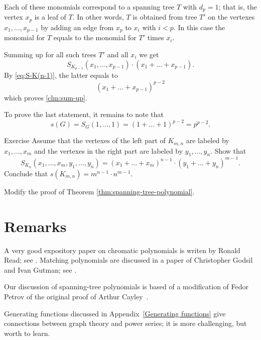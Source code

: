 Each of these monomials correspond to a spanning tree $T$ with $d_p=1$;
that is, the vertex $x_p$ is a leaf of $T$.
In other words, $T$ is obtained from tree $T'$ on the vertexes $x_1,\dots,x_{p-1}$ 
by adding an edge from $x_p$ to $x_i$ with $i<p$.
In this case the monomial for $T$ equals to the monomial for $T'$ times $x_i$.

Summing up for all such trees $T'$ and all $x_i$ we get 
\[S_{K_{p-1}}(x_1,\dots,x_{p-1})\cdot(x_1+\dots+x_{p-1}).\]
By \ref{eq:S-K(n-1)}, the latter equals to
\[(x_1+\dots+x_{p-1})^{p-2}\]
which proves \ref{clm:sum-up}.

To prove the last statement, it remains to note that 
\[s(G)=S_G(1,\dots,1)=(1+\dots+1)^{p-2}=p^{p-2}.\]
\qedsf

\begin{thm}{Exercise}
Assume that the vertexes of the left part of $K_{m,n}$ are labeled by $x_1,\dots,x_m$ and the vertexes in the right part are labeled by $y_1,\dots,y_n$. 
Show that
\[S_{K_n}(x_1,\dots,x_m,y_1,\dots,y_n)=(x_1+\dots +x_m)^{n-1}\cdot(y_1+\dots +y_n)^{m-1}.\]
Conclude that $s(K_{m,n})=m^{n-1}\cdot n^{m-1}$.

\end{thm}

 Modify the proof of Theorem \ref{thm:spanning-tree-polynomial}.

\section*{Remarks}

A very good expository paper on chromatic polynomials is writen by
Ronald Read; see \cite{read}. 
Matching polynomials are discussed in a paper of Christopher Godsil and Ivan Gutman; see \cite{godsil-gutman}.

Our discussion of spanning-tree polynomials is based of a modification of Fedor Petrov \cite{petrov} of the original proof of Arthur Cayley~\cite{cayley}. 

Generating functions discussed in Appendix~\ref{Generating functions} give connections between graph theory and power series; it is more challenging, but worth to learn.   
